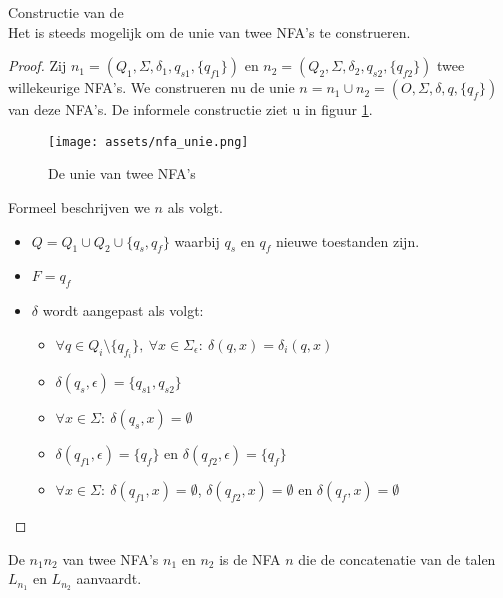 \documentclass[main.tex]{subfiles}
\begin{document}
\begin{st}
  \label{st:unie-nfas}
  Constructie van de \\
  Het is steeds mogelijk om de unie van twee NFA's te construeren.

  \begin{proof}
    Zij $n_{1} = (Q_{1},\Sigma,\delta_{1},q_{s1},\{q_{f1}\})$ en $n_{2} = (Q_{2},\Sigma,\delta_{2},q_{s2},\{q_{f2}\})$ twee willekeurige NFA's. We construeren nu de unie $n = n_{1} \cup n_{2} = (O,\Sigma,\delta,q,\{q_{f}\})$ van deze NFA's.
    De informele constructie ziet u in figuur \ref{fig:nfa_unie}.
    \begin{figure}[H]
      \centering
      \texttt{[image: assets/nfa\_unie.png]}      
      \caption{De unie van twee NFA's}
      \label{fig:nfa_unie}
    \end{figure}
    Formeel beschrijven we $n$ als volgt.
    \begin{itemize}
    \item $Q = Q_{1} \cup Q_{2} \cup \{ q_{s}, q_{f} \}$ waarbij $q_{s}$ en $q_{f}$ nieuwe toestanden zijn.
    \item $F = {q_{f}}$
    \item $\delta$ wordt aangepast als volgt:
      \begin{itemize}
      \item $\forall q \in Q_{i}\setminus\{q_{f_{i}}\},\ \forall x \in \Sigma_{\epsilon}:\ \delta(q,x) = \delta_{i}(q,x)$
      \item $\delta(q_{s},\epsilon) = \{q_{s1},q_{s2}\}$
      \item $\forall x \in \Sigma:\ \delta(q_{s},x) = \emptyset$
      \item $\delta(q_{f1},\epsilon) = \{q_{f}\}$ en $\delta(q_{f2},\epsilon) = \{q_{f}\}$
      \item $\forall x \in \Sigma:\ \delta(q_{f1},x) = \emptyset$, $\delta(q_{f2},x) = \emptyset$ en $\delta(q_{f},x) = \emptyset$ 
      \end{itemize}
    \end{itemize}
  \end{proof}
\end{st}

\begin{de}
  De  $n_{1}n_{2}$ van twee NFA's $n_{1}$ en $n_{2}$ is de NFA $n$ die de concatenatie van de talen $L_{n_{1}}$ en $L_{n_{2}}$ aanvaardt.
\end{de}
\end{document}
